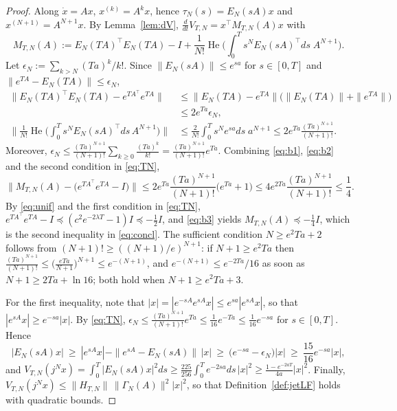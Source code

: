 \documentclass[preprint,12pt,authoryear]{elsarticle}
\theoremstyle{definition}
\theoremstyle{remark}
\newcommand{\tr}{^{\top}}
\DeclareMathOperator{\He}{He}
\begin{document}
\begin{proof}
Along $\dot x=Ax$, $x^{(k)}=A^kx$, hence $\tau_N(s)=E_N(sA)x$ and $x^{(N+1)}=A^{N+1}x$. By Lemma~\ref{lem:dV}, $\frac{d}{dt}V_{T,N}=x\tr M_{T,N}(A)x$ with
\begin{equation}\label{eq:M}
M_{T,N}(A):=E_N(TA)\tr E_N(TA)-I+\frac{1}{N!}\He\Big(\int_0^Ts^NE_N(sA)\tr ds\;A^{N+1}\Big).
\end{equation}
Let $\epsilon_N:=\sum_{k>N}(Ta)^k/k!$. Since $\|E_N(sA)\|\le e^{sa}$ for $s\in[0,T]$ and $\|e^{TA}-E_N(TA)\|\le\epsilon_N$,
\begin{align}
\|E_N(TA)\tr E_N(TA)-e^{TA\tr}e^{TA}\|&\le\|E_N(TA)-e^{TA}\|\big(\|E_N(TA)\|+\|e^{TA}\|\big)\nonumber\\&\le2e^{Ta}\epsilon_N,\label{eq:b1}\\
\Big\|\frac{1}{N!}\He\Big(\int_0^Ts^NE_N(sA)\tr ds\,A^{N+1}\Big)\Big\|&\le\frac{2}{N!}\int_0^Ts^Ne^{sa}ds\;a^{N+1}\le2e^{Ta}\frac{(Ta)^{N+1}}{(N+1)!}.\label{eq:b2}
\end{align}
Moreover, $\epsilon_N\le\frac{(Ta)^{N+1}}{(N+1)!}\sum_{k\ge0}\frac{(Ta)^k}{k!}=\frac{(Ta)^{N+1}}{(N+1)!}e^{Ta}$. Combining \eqref{eq:b1}, \eqref{eq:b2} and the second condition in \eqref{eq:TN},
\begin{equation}\label{eq:b3}
\big\|M_{T,N}(A)-\big(e^{TA\tr}e^{TA}-I\big)\big\|\le2e^{Ta}\frac{(Ta)^{N+1}}{(N+1)!}\big(e^{Ta}+1\big)\le4e^{2Ta}\frac{(Ta)^{N+1}}{(N+1)!}\le\frac14 .
\end{equation}
By \eqref{eq:unif} and the first condition in \eqref{eq:TN}, $e^{TA\tr}e^{TA}-I\preceq(c^2e^{-2\lambda T}-1)I\preceq-\frac12I$, and \eqref{eq:b3} yields $M_{T,N}(A)\preceq-\frac14I$, which is the second inequality in \eqref{eq:concl}. The sufficient condition $N\ge e^2Ta+2$ follows from $(N+1)!\ge((N+1)/e)^{N+1}$: if $N+1\ge e^2Ta$ then $\frac{(Ta)^{N+1}}{(N+1)!}\le\big(\frac{eTa}{N+1}\big)^{N+1}\le e^{-(N+1)}$, and $e^{-(N+1)}\le e^{-2Ta}/16$ as soon as $N+1\ge2Ta+\ln16$; both hold when $N+1\ge e^2Ta+3$.

For the first inequality, note that $|x|=|e^{-sA}e^{sA}x|\le e^{sa}|e^{sA}x|$, so that $|e^{sA}x|\ge e^{-sa}|x|$. By \eqref{eq:TN}, $\epsilon_N\le\frac{(Ta)^{N+1}}{(N+1)!}e^{Ta}\le\frac{1}{16}e^{-Ta}\le\frac1{16}e^{-sa}$ for $s\in[0,T]$. Hence
\begin{equation}
|E_N(sA)x|\ \ge\ |e^{sA}x|-\|e^{sA}-E_N(sA)\|\,|x|\ \ge\ \big(e^{-sa}-\epsilon_N\big)|x|\ \ge\ \frac{15}{16}e^{-sa}|x| ,
\end{equation}
and $V_{T,N}(j^Nx)=\int_0^T|E_N(sA)x|^2ds\ge\frac{225}{256}\int_0^Te^{-2sa}ds\,|x|^2\ge\frac{1-e^{-2aT}}{4a}|x|^2$. Finally, $V_{T,N}(j^Nx)\le\|H_{T,N}\|\,\|\Gamma_N(A)\|^2|x|^2$, so that Definition~\ref{def:jetLF} holds with quadratic bounds.
\end{proof}
\end{document}
